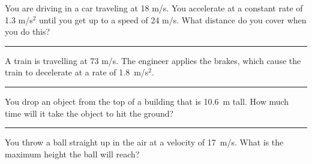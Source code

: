 \documentclass[12pt]{exam}
\begin{document}
\begin{questions}

\Large

\question You are driving in a car traveling at 18 m/s.  You accelerate at a constant rate of 1.3 m/s$^2$ until you get up to a speed of 24 m/s.  What distance do you cover when you do this?

\vs\hrule\vs

\question A train is travelling at 73 m/s.  The engineer applies the brakes, which cause the train to decelerate at a rate of 1.8~m/s$^2$.


\vs\hrule\vs


\question You drop an object from the top of a building that is 10.6~m tall.  How much time will it take the object to hit the ground?

\vs\hrule\vs

\question You throw a ball straight up in the air at a velocity of 17~m/s.  What is the maximum height the ball will reach?

\end{questions}
\end{document}

